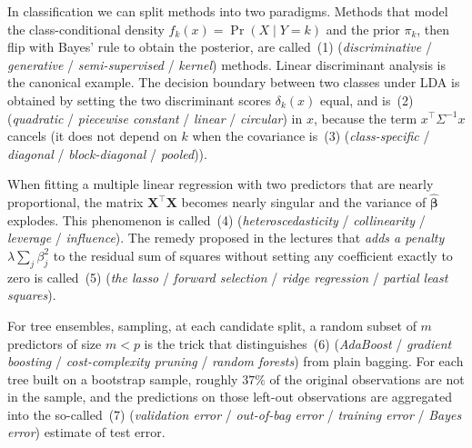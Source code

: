 \documentclass[11pt,a4paper]{article}
\begin{document}
In classification we can split methods into two paradigms. Methods that model the class-conditional density $f_k(x) = \Pr(X \mid Y = k)$ and the prior $\pi_k$, then flip with Bayes' rule to obtain the posterior, are called \underline{\hspace{2.5cm}}\,(1) (\emph{discriminative} / \emph{generative} / \emph{semi-supervised} / \emph{kernel}) methods. Linear discriminant analysis is the canonical example. The decision boundary between two classes under LDA is obtained by setting the two discriminant scores $\delta_k(x)$ equal, and is \underline{\hspace{2.5cm}}\,(2) (\emph{quadratic} / \emph{piecewise constant} / \emph{linear} / \emph{circular}) in $x$, because the term $x^\top \Sigma^{-1} x$ cancels (it does not depend on $k$ when the covariance is \underline{\hspace{2.5cm}}\,(3) (\emph{class-specific} / \emph{diagonal} / \emph{block-diagonal} / \emph{pooled})).

When fitting a multiple linear regression with two predictors that are nearly proportional, the matrix $\mathbf X^\top \mathbf X$ becomes nearly singular and the variance of $\hat{\boldsymbol\beta}$ explodes. This phenomenon is called \underline{\hspace{2.5cm}}\,(4) (\emph{heteroscedasticity} / \emph{collinearity} / \emph{leverage} / \emph{influence}). The remedy proposed in the lectures that \emph{adds a penalty} $\lambda \sum_j \beta_j^2$ to the residual sum of squares without setting any coefficient exactly to zero is called \underline{\hspace{2.5cm}}\,(5) (\emph{the lasso} / \emph{forward selection} / \emph{ridge regression} / \emph{partial least squares}).

For tree ensembles, sampling, at each candidate split, a random subset of $m$ predictors of size $m < p$ is the trick that distinguishes \underline{\hspace{2.5cm}}\,(6) (\emph{AdaBoost} / \emph{gradient boosting} / \emph{cost-complexity pruning} / \emph{random forests}) from plain bagging. For each tree built on a bootstrap sample, roughly $37\%$ of the original observations are not in the sample, and the predictions on those left-out observations are aggregated into the so-called \underline{\hspace{2.5cm}}\,(7) (\emph{validation error} / \emph{out-of-bag error} / \emph{training error} / \emph{Bayes error}) estimate of test error.
\end{document}
